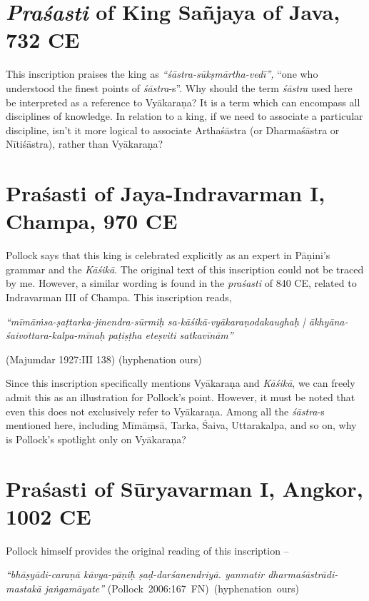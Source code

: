 \section{{\sl\bfseries Praśasti} of King Sañjaya of Java, 732 CE}\label{chap3-sec4}

This inscription praises the king as {\sl ``śāstra-sūkṣmārtha-vedī'',} ``one who understood the finest points of {\sl śāstra}-s''. Why should the term {\sl śāstra} used here be interpreted as a reference to Vyākaraṇa? It is a term which can encompass all disciplines of knowledge. In relation to a king, if we need to associate a particular discipline, isn't it more logical to associate Arthaśāstra (or Dharmaśāstra or Nītiśāstra), rather than Vyākaraṇa?

\section{Praśasti of Jaya-Indravarman I, Champa, 970 CE}\label{chap3-sec5}

Pollock says that this king is celebrated explicitly as an expert in Pāṇini's grammar and the {\sl Kāśikā}.  The original text of this inscription could not be traced by me. However, a similar wording is found in the {\sl praśasti} of 840 CE, related to Indravarman III of Champa. This inscription reads, 
\begin{myquote}
{{\sl ``mīmāṁsa-ṣaṭtarka-jinendra-sūrmiḥ sa-kāśikā-vyākaraṇodakaughaḥ | ākhyāna-śaivottara-kalpa-mīnaḥ paṭiṣṭha eteṣviti satkavīnām''}}

\hfill (Majumdar 1927:III 138) (hyphenation ours)
\end{myquote}

Since this inscription specifically mentions Vyākaraṇa and {\sl Kāśikā},  we can freely admit this as an illustration for Pollock's point. However, it must be noted that even this does not exclusively refer to Vyākaraṇa. Among all the {\sl śāstra}-s mentioned here, including Mīmāṃsā, Tarka, Śaiva, Uttarakalpa, and so on, why is Pollock's spotlight only on Vyākaraṇa?

\section{Praśasti of Sūryavarman I, Angkor, 1002 CE}\label{chap3-sec6}

Pollock himself provides the original reading of this inscription --
\begin{myquote}
{{\sl ``bhāṣyādi-caraṇā kāvya-pāṇiḥ ṣaḍ-darśanendriyā. yanmatir dharmaśāstrādi-mastakā jaṅgamāyate''}\relax}
\hfill \hbox{(Pollock 2006:167 FN) (hyphenation ours)}
\end{myquote}

